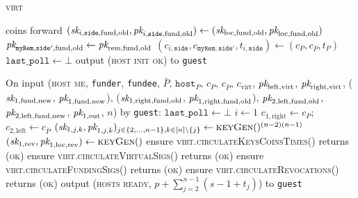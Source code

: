 \begin{center}
\begin{processbox}{\textsc{virt}}
\begin{algorithmic}[1]
{{          coins forward}}
        \EndIf
        \State $(\textit{sk}_{i, \texttt{side}, \mathrm{fund}, \mathrm{old}}, \textit{pk}_{i,
        \texttt{side}, \mathrm{fund}, \mathrm{old}}) \gets (\textit{sk}_{\mathrm{loc},
        \mathrm{fund}, \mathrm{old}}, \textit{pk}_{\mathrm{loc}, \mathrm{fund},
        \mathrm{old}})$
        \State $\textit{pk}_{\texttt{myRem}, \texttt{side}', \mathrm{fund}, \mathrm{old}}
        \gets \textit{pk}_{\mathrm{rem}, \mathrm{fund}, \mathrm{old}}$
        \State $(c_{i, \texttt{side}}, c_{\texttt{myRem}, \texttt{side}'}, t_{i,
        \texttt{side}}) \gets (c_P, c_{\bar{P}}, t_P)$
        \State $\texttt{last\_poll} \gets \bot$
        \State output (\textsc{host init ok}) to \texttt{guest}
      \EndIndent
      \Statex

      \State On input (\textsc{host me}, \texttt{funder}, \texttt{fundee},
      $\bar{P}$, $\texttt{host}_P$, $c_P$, $c_{\bar{P}}$, $c_{\mathrm{virt}}$,
      $\textit{pk}_{\mathrm{left}, \mathrm{virt}}$, $\textit{pk}_{\mathrm{right}, \mathrm{virt}}$,
      ($\textit{sk}_{1, \mathrm{fund}, \mathrm{new}}$, $\textit{pk}_{1, \mathrm{fund},
      \mathrm{new}}$), ($\textit{sk}_{1, \mathrm{right}, \mathrm{fund}, \mathrm{old}}$,
      $\textit{pk}_{1, \mathrm{right}, \mathrm{fund}, \mathrm{old}}$), $\textit{pk}_{2,
      \mathrm{left}, \mathrm{fund}, \mathrm{old}}$, $\textit{pk}_{2, \mathrm{left},
      \mathrm{fund}, \mathrm{new}}$, $\textit{pk}_{1, \mathrm{out}}$, $n$) by
      \texttt{guest}:
      \Indent
        \State $\texttt{last\_poll} \gets \bot$
        \State $i \gets 1$
        \State $c_{1, \mathrm{right}} \gets c_P$; $c_{2, \mathrm{left}} \gets
        c_{\bar{P}}$
        \label{code:virtual-layer:keys:host-me:set-i}
        \State $(\textit{sk}_{1, j, k}, \textit{pk}_{1, j, k})_{j \in \{2, \dots, n-1\}, k \in [n]
        \setminus \{j\}} \gets \textsc{keyGen}()^{(n-2)(n-1)}$
          \State $(\textit{sk}_{1, \mathrm{rev}}, \textit{pk}_{1, \mathrm{loc},
          \mathrm{rev}}) \gets \textsc{keyGen}()$
        \State ensure \textsc{virt.circulateKeysCoinsTimes}() returns
        (\textsc{ok})
        \State ensure \textsc{virt.circulateVirtualSigs}() returns (\textsc{ok})
        \State ensure \textsc{virt.circulateFundingSigs}() returns (\textsc{ok})
        \State ensure \textsc{virt.circulateRevocations}() returns (\textsc{ok})
        \State output (\textsc{hosts ready}, $p + \sum\limits_{j = 2}^{n-1}(s -
        1 + t_j)$) to \texttt{guest} 
      \EndIndent
    \end{algorithmic}
  \end{processbox}
  \label{code:virtual-layer:keys}
\end{center} \ \\

